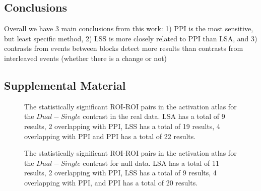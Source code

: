 \documentclass[phd,appendix,figures]{uithesis}
\begin{document}
\subsection{Conclusions}
Overall we have 3 main conclusions from this work:
1) PPI is the most sensitive, but least specific method,
2) LSS is more closely related to PPI than LSA, and
3) contrasts from events between blocks detect more results than contrasts
from interleaved events (whether there is a change or not)

\subsection{Supplemental Material}

\begin{figure}[H]
  \centering


  \caption[All contrasts for all atlases for all data for LSA/LSS versus PPI]{
      The statistically significant ROI-ROI pairs in the activation atlas
      for the $Dual - Single$ contrast in the real data.
      LSA has a total of 9 results, 2 overlapping with PPI,
      LSS has a total of 19 results, 4 overlapping with PPI and
      PPI has a total of 22 results.
  }
  \label{fig:data-real_type-brain_atlas-activation_contrast-dualxsingle}
\end{figure}

\begin{figure}[H]
  \ContinuedFloat
  \centering


  \caption[All contrasts for all atlases for all data for LSA/LSS versus PPI continued...]{
      The statistically significant ROI-ROI pairs in the activation atlas
      for the $Dual - Single$ contrast for null data.
      LSA has a total of 11 results, 2 overlapping with PPI,
      LSS has a total of 9 results, 4 overlapping with PPI,
      and PPI has a total of 20 results.
  }
  \label{fig:data-null_type-brain_atlas-activation_contrast-dualxsingle}
\end{figure}
\end{document}

